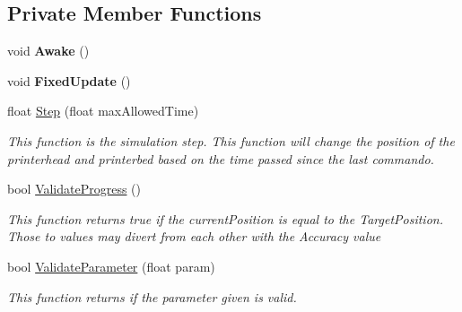 \subsection*{Private Member Functions}
\begin{DoxyCompactItemize}
\item 
\mbox{\label{class_printer_a602798adcce92661706652544c680d0b}} 
void {\bfseries Awake} ()
\item 
\mbox{\label{class_printer_a61ba75c68460bf63507918ace012055a}} 
void {\bfseries Fixed\+Update} ()
\item 
float \hyperlink{class_printer_a4d61c283439ea47644d326c802fd405a}{Step} (float max\+Allowed\+Time)
\begin{DoxyCompactList}\small\item\em This function is the simulation step. This function will change the position of the printerhead and printerbed based on the time passed since the last commando. \end{DoxyCompactList}\item 
bool \hyperlink{class_printer_ab3c07108e5f5d6f7a7fcfaea556988fc}{Validate\+Progress} ()
\begin{DoxyCompactList}\small\item\em This function returns true if the current\+Position is equal to the Target\+Position. Those to values may divert from each other with the Accuracy value \end{DoxyCompactList}\item 
bool \hyperlink{class_printer_a2c8c5ca69f0633a9509ff69b03e6406f}{Validate\+Parameter} (float param)
\begin{DoxyCompactList}\small\item\em This function returns if the parameter given is valid. \end{DoxyCompactList}\end{DoxyCompactItemize}
